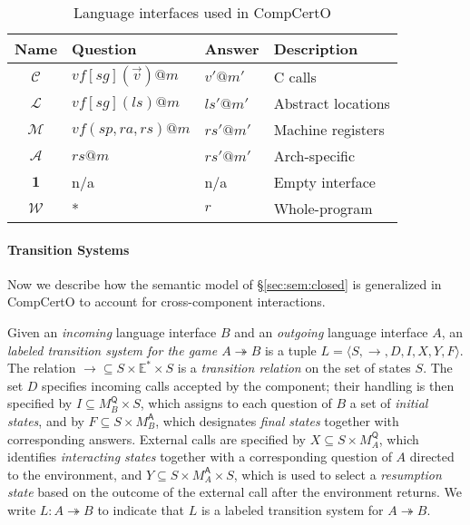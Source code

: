 \documentclass[sigplan,10pt,review,anonymous]{acmart}\settopmatter{printfolios=true,printccs=false,printacmref=false}
\newcommand{\kw}[1]{\ensuremath{ \mathsf{#1} }}
\begin{document}

\begin{table} %
  \begin{tabular}{clll}
    \hline
    Name & Question & Answer & Description \\
    \hline
    $\mathcal{C}$ &
      $\mathit{vf}[\mathit{sg}](\vec{v})@m$ & $v'@m'$ &
      C calls \\
    $\mathcal{L}$ &
      $\mathit{vf}[\mathit{sg}](\mathit{ls})@m$ & $\mathit{ls}'@m'$ &
      Abstract locations \\
    $\mathcal{M}$ &
      $\mathit{vf}(\mathit{sp},\mathit{ra},\mathit{rs})@m$ & $\mathit{rs}'@m'$ &
      Machine registers \\
    $\mathcal{A}$ &
      $\mathit{rs}@m$ & $\mathit{rs}'@m'$ &
      Arch-specific \\
    $\mathbf{1}$ & n/a & n/a &
      Empty interface \\
    $\mathcal{W}$ & * & $r$ &
      Whole-program \\
    \hline
  \end{tabular}
  \caption{Language interfaces used in CompCertO}
  \label{tbl:li}
\end{table}

\paragraph{Transition Systems} %

Now we describe how the semantic model of
\S\ref{sec:sem:closed}
is generalized in CompCertO
to account for cross-component interactions.

\begin{definition}
Given an \emph{incoming} language interface $B$
and an \emph{outgoing} language interface $A$,
an \emph{labeled transition system for the game $A \twoheadrightarrow B$}
is a tuple $L = \langle S, \rightarrow, D, I, X, Y, F \rangle$.
The relation
${\rightarrow} \subseteq S \times \mathbb{E}^* \times S$ is
a \emph{transition relation} on the set of states $S$.
The set $D$ specifies incoming calls accepted by the component;
their handling is then specified by
$I \subseteq M_B^\kw{Q} \times S$, which
assigns to each question of $B$ a set of \emph{initial states}, and by
$F \subseteq S \times M_B^\kw{A}$,
which designates \emph{final states} together with corresponding answers.
External calls are specified by
$X \subseteq S \times M_A^\kw{Q}$,
which identifies \emph{interacting states} together with
a corresponding question of $A$ directed to the environment, and
$Y \subseteq S \times M_A^\kw{A} \times S$,
which is used to select a \emph{resumption state}
based on the outcome of the external call
after the environment returns.
We write $L : A \twoheadrightarrow B$ to indicate that
$L$ is a labeled transition system for $A \twoheadrightarrow B$.
\end{definition}
\end{document}
